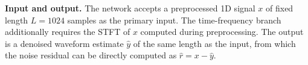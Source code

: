 \textbf{Input and output.} The network accepts a preprocessed 1D signal $x$ of fixed length $L = 1024$ samples as the primary input. The time-frequency branch additionally requires the STFT of $x$ computed during preprocessing. The output is a denoised waveform estimate $\hat{y}$ of the same length as the input, from which the noise residual can be directly computed as $\hat{r} = x - \hat{y}$.